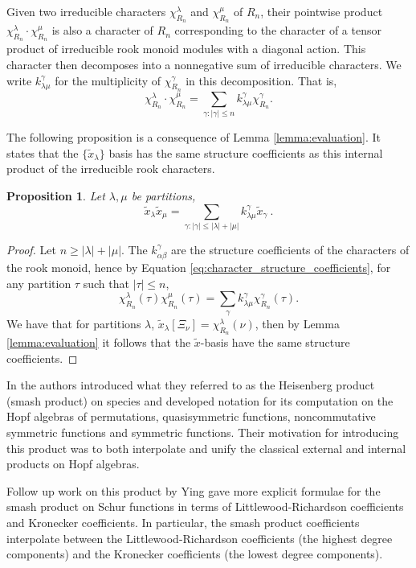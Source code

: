 \documentclass{amsart}
\newtheorem{prop}[lemma]{Proposition}
\theoremstyle{definition}
\newcommand{\xt}{\tilde x}
\begin{document}
Given two irreducible characters $\chi^\lambda_{R_n}$ and $\chi^\mu_{R_n}$ of $R_n$, their pointwise product $\chi^\lambda_{R_n}\cdot\chi^\mu_{R_n}$ is also a character of $R_n$ corresponding to the character of
a tensor product of irreducible rook monoid modules with a diagonal action.
This character then decomposes into a nonnegative sum of irreducible characters.
We write $k_{\lambda\mu}^\gamma$ for the multiplicity of $\chi^\gamma_{R_n}$ in this decomposition.
That is,
\begin{equation}\label{eq:character_structure_coefficients}
\chi^\lambda_{R_n}\cdot\chi^\mu_{R_n}=\sum_{\gamma:|\gamma|\leq n}k_{\lambda\mu}^\gamma\chi^\gamma_{R_n}.
\end{equation}

The following proposition is a consequence of
Lemma \ref{lemma:evaluation}.  It states that the $\{\xt_\lambda\}$
basis has the same structure coefficients as this internal product of the
irreducible rook characters.

\begin{prop}\label{prop:structure}
Let $\lambda, \mu$ be partitions,
\[
\xt_\lambda \xt_\mu = \sum_{\gamma:|\gamma|\leq |\lambda|+|\mu|}k_{\lambda\mu}^\gamma \xt_\gamma~.
\]
\end{prop}

\begin{proof}
Let $n\geq |\lambda|+|\mu|$.
The $k_{\alpha\beta}^\gamma$ are the structure coefficients of the characters
of the rook monoid, hence by Equation \eqref{eq:character_structure_coefficients},
for any partition $\tau$ such that $|\tau| \leq n$,
\[
\chi^{\lambda}_{R_n}(\tau) \chi^{\mu}_{R_n}(\tau)
= \sum_{\gamma} k_{\lambda\mu}^\gamma \chi^\gamma_{R_n}(\tau).
\]
We have that for partitions $\lambda$, $\tilde{x}_\lambda[\Xi_\nu] = \chi^{\lambda}_{R_n}(\nu)$,
then by Lemma \ref{lemma:evaluation} it follows that the $\tilde{x}$-basis have the same structure coefficients.
\end{proof}

In \cite{AFM} the authors introduced what they referred to as the
Heisenberg product (smash product) on species and developed notation for its
computation on the Hopf algebras of permutations, quasisymmetric functions,
noncommutative symmetric functions and symmetric functions.
Their motivation for introducing this product was to both interpolate and unify
the classical external and internal products on Hopf algebras.

Follow up work on this product by Ying \cite{Ying20, Ying22}
gave more explicit formulae for the smash product on Schur
functions in terms of Littlewood-Richardson coefficients
and Kronecker coefficients.
In particular, the smash product coefficients interpolate between
the Littlewood-Richardson coefficients (the highest degree components) and the Kronecker
coefficients (the lowest degree components).
\end{document}
